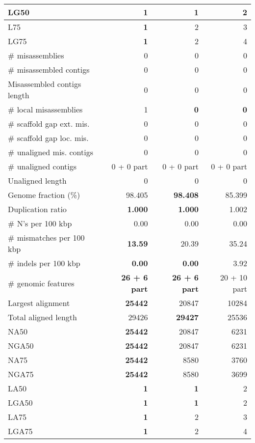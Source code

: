 \documentclass[12pt,a4paper]{article}
\begin{document}
\begin{table}[ht]
\begin{center}
\begin{tabular}{|l*{3}{|r}|}
LG50 & {\bf 1} & {\bf 1} & 2 \\ \hline
L75 & {\bf 1} & 2 & 3 \\ \hline
LG75 & {\bf 1} & 2 & 4 \\ \hline
\# misassemblies & 0 & 0 & 0 \\ \hline
\# misassembled contigs & 0 & 0 & 0 \\ \hline
Misassembled contigs length & 0 & 0 & 0 \\ \hline
\# local misassemblies & 1 & {\bf 0} & {\bf 0} \\ \hline
\# scaffold gap ext. mis. & 0 & 0 & 0 \\ \hline
\# scaffold gap loc. mis. & 0 & 0 & 0 \\ \hline
\# unaligned mis. contigs & 0 & 0 & 0 \\ \hline
\# unaligned contigs & 0 + 0 part & 0 + 0 part & 0 + 0 part \\ \hline
Unaligned length & 0 & 0 & 0 \\ \hline
Genome fraction (\%) & 98.405 & {\bf 98.408} & 85.399 \\ \hline
Duplication ratio & {\bf 1.000} & {\bf 1.000} & 1.002 \\ \hline
\# N's per 100 kbp & 0.00 & 0.00 & 0.00 \\ \hline
\# mismatches per 100 kbp & {\bf 13.59} & 20.39 & 35.24 \\ \hline
\# indels per 100 kbp & {\bf 0.00} & {\bf 0.00} & 3.92 \\ \hline
\# genomic features & {\bf 26 + 6 part} & {\bf 26 + 6 part} & 20 + 10 part \\ \hline
Largest alignment & {\bf 25442} & 20847 & 10284 \\ \hline
Total aligned length & 29426 & {\bf 29427} & 25536 \\ \hline
NA50 & {\bf 25442} & 20847 & 6231 \\ \hline
NGA50 & {\bf 25442} & 20847 & 6231 \\ \hline
NA75 & {\bf 25442} & 8580 & 3760 \\ \hline
NGA75 & {\bf 25442} & 8580 & 3699 \\ \hline
LA50 & {\bf 1} & {\bf 1} & 2 \\ \hline
LGA50 & {\bf 1} & {\bf 1} & 2 \\ \hline
LA75 & {\bf 1} & 2 & 3 \\ \hline
LGA75 & {\bf 1} & 2 & 4 \\ \hline
\end{tabular}
\end{center}
\end{table}
\end{document}
